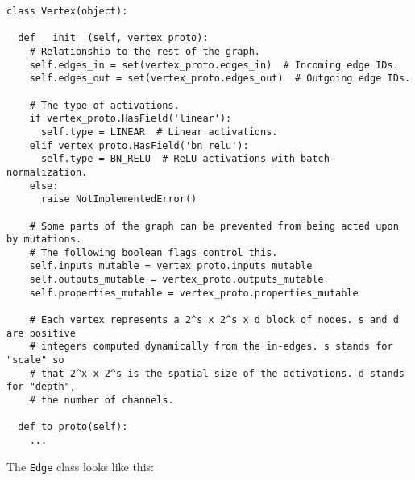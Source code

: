 \documentclass{article}
\begin{document}
\begin{lstlisting}
class Vertex(object):

  def __init__(self, vertex_proto):
    # Relationship to the rest of the graph.
    self.edges_in = set(vertex_proto.edges_in)  # Incoming edge IDs.
    self.edges_out = set(vertex_proto.edges_out)  # Outgoing edge IDs.

    # The type of activations.
    if vertex_proto.HasField('linear'):
      self.type = LINEAR  # Linear activations.
    elif vertex_proto.HasField('bn_relu'):
      self.type = BN_RELU  # ReLU activations with batch-normalization.
    else:
      raise NotImplementedError()
    
    # Some parts of the graph can be prevented from being acted upon by mutations.
    # The following boolean flags control this.
    self.inputs_mutable = vertex_proto.inputs_mutable
    self.outputs_mutable = vertex_proto.outputs_mutable
    self.properties_mutable = vertex_proto.properties_mutable
    
    # Each vertex represents a 2^s x 2^s x d block of nodes. s and d are positive
    # integers computed dynamically from the in-edges. s stands for "scale" so
    # that 2^x x 2^s is the spatial size of the activations. d stands for "depth",
    # the number of channels.
    
  def to_proto(self):
    ...
\end{lstlisting}
The \lstinline{Edge} class looks like this:
\smallskip
\end{document}
